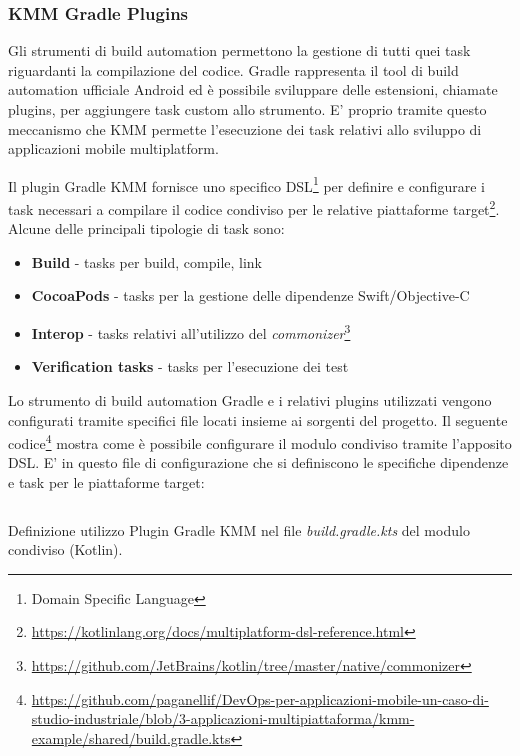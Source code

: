 \subsubsection{KMM Gradle Plugins}
Gli strumenti di build automation permettono la gestione di tutti quei task riguardanti la compilazione del codice. Gradle rappresenta il tool di build automation ufficiale Android ed è possibile sviluppare delle estensioni, chiamate plugins, per aggiungere task custom allo strumento. E' proprio tramite questo meccanismo che KMM permette l'esecuzione dei task relativi allo sviluppo di applicazioni mobile multiplatform.

Il plugin Gradle KMM fornisce uno specifico DSL\footnote{Domain Specific Language} per definire e configurare i task necessari a compilare il codice condiviso per le relative piattaforme target\footnote{\href{https://kotlinlang.org/docs/multiplatform-dsl-reference.html}{https://kotlinlang.org/docs/multiplatform-dsl-reference.html}}. Alcune delle principali tipologie di task sono:

\begin{itemize}
    \item \textbf{Build} - tasks per build, compile, link
    \item \textbf{CocoaPods} - tasks per la gestione delle dipendenze Swift/Objective-C
    \item \textbf{Interop} - tasks relativi all'utilizzo del \textit{commonizer}\footnote{\href{https://github.com/JetBrains/kotlin/tree/master/native/commonizer}{https://github.com/JetBrains/kotlin/tree/master/native/commonizer}}
    \item \textbf{Verification tasks} - tasks per l'esecuzione dei test
\end{itemize}

Lo strumento di build automation Gradle e i relativi plugins utilizzati vengono configurati tramite specifici file locati insieme ai sorgenti del progetto. Il seguente codice\footnote{\href{https://github.com/paganellif/DevOps-per-applicazioni-mobile-un-caso-di-studio-industriale/blob/3-applicazioni-multipiattaforma/kmm-example/shared/build.gradle.kts}{https://github.com/paganellif/DevOps-per-applicazioni-mobile-un-caso-di-studio-industriale/blob/3-applicazioni-multipiattaforma/kmm-example/shared/build.gradle.kts}} mostra come è possibile configurare il modulo condiviso tramite l'apposito DSL. E' in questo file di configurazione che si definiscono le specifiche dipendenze e task per le piattaforme target:

\begin{listing}[H]
\inputminted{kotlin}{code/3-gradlekmm2}
\caption{Definizione utilizzo Plugin Gradle KMM nel file \textit{build.gradle.kts} del modulo condiviso (Kotlin).}
\end{listing}


